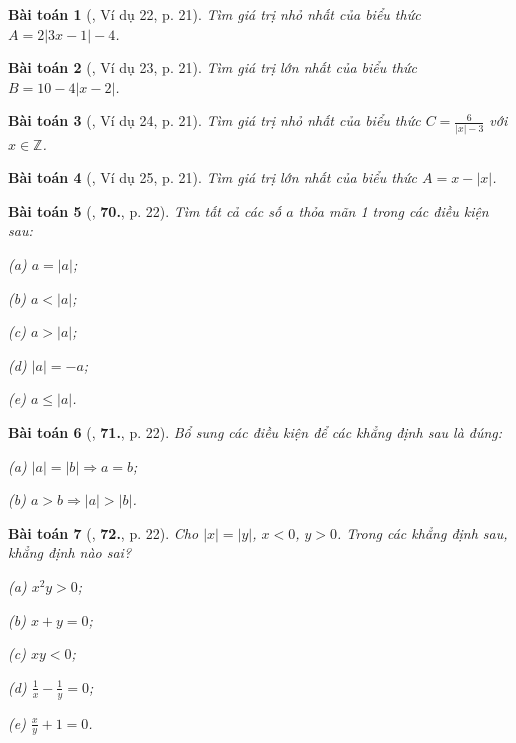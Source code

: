 \documentclass{article}
\numberwithin{equation}{section}
\newtheorem{baitoan}{Bài toán}[section]
\begin{document}
\begin{baitoan}[\cite{Binh_Toan_7_tap_1}, Ví dụ 22, p. 21]
	Tìm giá trị nhỏ nhất của biểu thức $A = 2|3x - 1| - 4$.
\end{baitoan}

\begin{baitoan}[\cite{Binh_Toan_7_tap_1}, Ví dụ 23, p. 21]
	Tìm giá trị lớn nhất của biểu thức $B = 10 - 4|x - 2|$.
\end{baitoan}

\begin{baitoan}[\cite{Binh_Toan_7_tap_1}, Ví dụ 24, p. 21]
	Tìm giá trị nhỏ nhất của biểu thức $C = \frac{6}{|x| - 3}$ với $x\in\mathbb{Z}$.
\end{baitoan}

\begin{baitoan}[\cite{Binh_Toan_7_tap_1}, Ví dụ 25, p. 21]
	Tìm giá trị lớn nhất của biểu thức $A = x - |x|$.
\end{baitoan}

\begin{baitoan}[\cite{Binh_Toan_7_tap_1}, \textbf{70.}, p. 22]
	Tìm tất cả các số $a$ thỏa mãn 1 trong các điều kiện sau:
	\begin{enumerate*}
		\item[(a)] $a = |a|$;
		\item[(b)] $a < |a|$;
		\item[(c)] $a > |a|$;
		\item[(d)] $|a| = -a$;
		\item[(e)] $a\le|a|$.
	\end{enumerate*}
\end{baitoan}

\begin{baitoan}[\cite{Binh_Toan_7_tap_1}, \textbf{71.}, p. 22]
	Bổ sung các điều kiện để các khẳng định sau là đúng:
	\begin{enumerate*}
		\item[(a)] $|a| = |b|\Rightarrow a = b$;
		\item[(b)] $a > b\Rightarrow|a| > |b|$.
	\end{enumerate*}
\end{baitoan}

\begin{baitoan}[\cite{Binh_Toan_7_tap_1}, \textbf{72.}, p. 22]
	Cho $|x| = |y|$, $x < 0$, $y > 0$. Trong các khẳng định sau, khẳng định nào sai?
	\begin{enumerate*}
		\item[(a)] $x^2y > 0$;
		\item[(b)] $x + y = 0$;
		\item[(c)] $xy < 0$;
		\item[(d)] $\frac{1}{x} - \frac{1}{y} = 0$;
		\item[(e)] $\frac{x}{y} + 1 = 0$.
	\end{enumerate*}
\end{baitoan}
\end{document}
